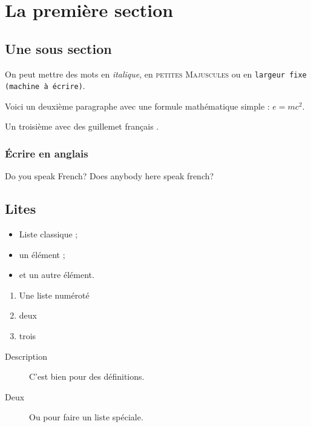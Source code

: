 \section{La première section}


\subsection{Une sous section}

On peut mettre des mots en \emph{italique}, 
en \textsc{petites Majuscules} ou 
en \texttt{largeur fixe (machine à écrire)}.

Voici un deuxième paragraphe avec une formule mathématique simple : $e = mc^2$.

Un troisième avec des \og guillemet français \fg{}.

\subsubsection{Écrire en anglais}

\foreignlanguage{english}{Do you speak French? Does anybody here speak french?}


\subsection{Lites}

\begin{itemize}
\item Liste classique ;
\item un élément ;
\item et un autre élément.
\end{itemize}
\vspace{\parskip} %

\begin{enumerate}
\item Une liste numéroté
\item deux
\item trois
\end{enumerate}
\vspace{\parskip}

\begin{description}
\item[Description] C'est bien pour des définitions.
\item[Deux] Ou pour faire un liste spéciale.
\end{description}
\vspace{\parskip}


